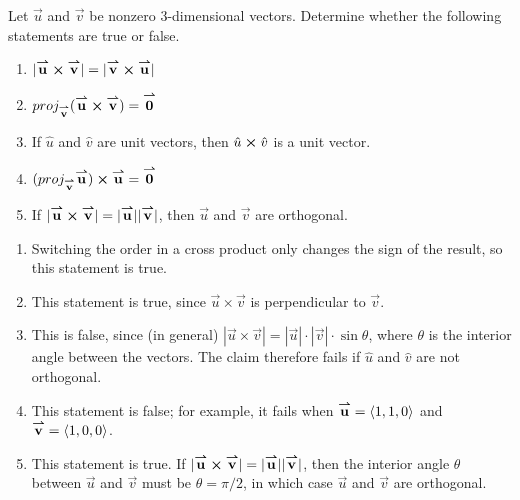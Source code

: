 \documentclass[]{ximera}
\begin{document}
\begin{problem}
Let $\vec{u}$ and $\vec{v}$ be nonzero $3$-dimensional vectors. Determine whether the following statements are true or false. 

\begin{enumerate}[label=(\alph*)]
\item $|\vec{u} \cross \vec{v}| = |\vec{v} \cross \vec{u}|$
\item $proj_{\vec{v}} (\vec{u} \cross \vec{v}) = \vec{0}$
\item If $\hat{u}$ and $\hat{v}$ are unit vectors, then $\hat{u} \cross \hat{v}$ is a unit vector. 
\item $(proj_{\vec{v}} \vec{u}) \cross \vec{u} = \vec{0}$
\item If $|\vec{u} \cross \vec{v}| = |\vec{u}||\vec{v}|$, then $\vec{u}$ and $\vec{v}$ are orthogonal. 
\end{enumerate}


\begin{solution}
\begin{enumerate}[label=(\alph*)]
\item Switching the order in a cross product only changes the sign of the result, so this statement is true.
\item This statement is true, since $\vec{u} \times \vec{v}$ is perpendicular to $\vec{v}$. 
\item This is false, since (in general) $\left|\vec{u} \times \vec{v}\right| = \left|\vec{u}\right| \cdot \left|\vec{v} \right| \cdot \sin \theta$, where $\theta$ is the interior angle between the vectors. The claim therefore fails if $\hat{u}$ and $\hat{v}$ are not orthogonal.
\item This statement is false; for example, it fails when $\vec{u} = \vector{1,1,0}$ and $\vec{v} = \vector{1,0,0}$. 
\item This statement is true. If $|\vec{u} \cross \vec{v}| = |\vec{u}||\vec{v}|$, then the interior angle $\theta$ between $\vec{u}$ and $\vec{v}$ must be $\theta = \pi/2$, in which case $\vec{u}$ and $\vec{v}$ are orthogonal. 
\end{enumerate}
\end{solution}
\end{problem}
\end{document}
